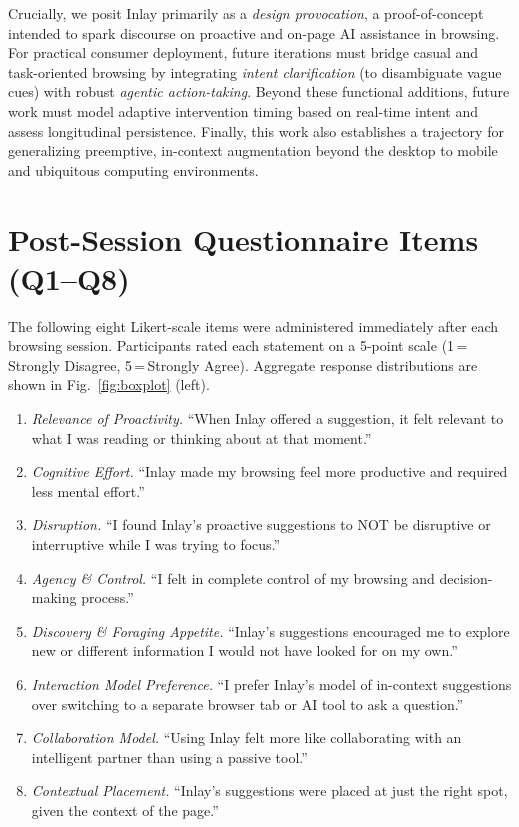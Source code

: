 \documentclass[sigconf]{acmart}
\begin{document}
Crucially, we posit Inlay primarily as a \textit{design provocation}, a proof-of-concept intended to spark discourse on proactive and on-page AI assistance in browsing. For practical consumer deployment, future iterations must bridge casual and task-oriented browsing by integrating \textit{intent clarification} (to disambiguate vague cues) with robust \textit{agentic action-taking}. Beyond these functional additions, future work must model adaptive intervention timing based on real-time intent and assess longitudinal persistence. Finally, this work also establishes a trajectory for generalizing preemptive, in-context augmentation beyond the desktop to mobile and ubiquitous computing environments.

\newpage






\appendix
\newpage
\section{Post-Session Questionnaire Items (Q1--Q8)}
\label{app:likert}
The following eight Likert-scale items were administered immediately after each browsing session. Participants rated each statement on a 5-point scale (1\,=\,Strongly Disagree, 5\,=\,Strongly Agree). Aggregate response distributions are shown in Fig.~\ref{fig:boxplot} (left).

\begin{enumerate}
    \item[\textbf{Q1}] \textit{Relevance of Proactivity.} ``When Inlay offered a suggestion, it felt relevant to what I was reading or thinking about at that moment.''
    \item[\textbf{Q2}] \textit{Cognitive Effort.} ``Inlay made my browsing feel more productive and required less mental effort.''
    \item[\textbf{Q3}] \textit{Disruption.} ``I found Inlay's proactive suggestions to NOT be disruptive or interruptive while I was trying to focus.''
    \item[\textbf{Q4}] \textit{Agency \& Control.} ``I felt in complete control of my browsing and decision-making process.''
    \item[\textbf{Q5}] \textit{Discovery \& Foraging Appetite.} ``Inlay's suggestions encouraged me to explore new or different information I would not have looked for on my own.''
    \item[\textbf{Q6}] \textit{Interaction Model Preference.} ``I prefer Inlay's model of in-context suggestions over switching to a separate browser tab or AI tool to ask a question.''
    \item[\textbf{Q7}] \textit{Collaboration Model.} ``Using Inlay felt more like collaborating with an intelligent partner than using a passive tool.''
    \item[\textbf{Q8}] \textit{Contextual Placement.} ``Inlay's suggestions were placed at just the right spot, given the context of the page.''
\end{enumerate}
\end{document}
